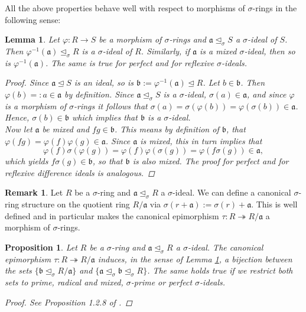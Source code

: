 \documentclass{article}
\def\a{\mathfrak{a}}
\def\b{\mathfrak{b}}
\def\s{\sigma}
\def\si{\unlhd_{\sigma}}
\newenvironment{bew}{\begin{proof}[Proof]}{\end{proof}}
\theoremstyle{plain}
\newtheorem{prop}[Satz]{Proposition}
\newtheorem{lem}[Satz]{Lemma}
\theoremstyle{definition}
\newtheorem{rem}[Satz]{Remark}
\begin{document}
All the above properties behave well with respect to morphisms of $\s$-rings in the following sense:
\begin{lem}\label{bijmapping}
Let $\varphi: R \rightarrow S$ be a morphism of $\s$-rings and $\a \si S$ a $\s$-ideal of $S$. Then $\varphi^{-1}(\a) \si R$ is a $\s$-ideal of $R$. Similarly, if $\a$ is a mixed $\s$-ideal, then so is $\varphi^{-1}(\a)$. The same is true for perfect and for reflexive $\s$-ideals.
\begin{bew}
Since $\a \unlhd S$ is an ideal, so is $\b := \varphi^{-1}(\a) \unlhd R$. Let $b \in \b$. Then $\varphi(b) =: a \in \a$ by definition. Since $\a \si S$ is a $\s$-ideal, $\s(a) \in \a$, and since $\varphi$ is a morphism of $\s$-rings
it follows that $\sigma(a) = \sigma(\varphi(b)) = \varphi (\s (b)) \in \a$. Hence, $\s(b) \in \b$ which implies that $\b$ is a $\s$-ideal. \\
\indent Now let $\a$ be mixed and $fg \in \b$. This means by definition of $\b$, 
that $\varphi(fg) = \varphi(f) \varphi(g) \in \a$. Since $\a$ is mixed, this in turn implies that $$\varphi(f) \s( \varphi(g)) = \varphi(f) \varphi(\s(g)) = \varphi(f\s(g)) \in \a,$$ which yields $f\s(g) \in \b$, so that $\b$ is also mixed. 
The proof for perfect and for reflexive difference ideals is analogous.
\end{bew}
\end{lem}

\begin{rem}
Let $R$ be a $\s$-ring and $\a \si R$ a $\s$-ideal. We can define a canonical $\s$-ring structure on the quotient ring $R/\a$ via $\s(r+\a):= \s(r) + \a$. 
This is well defined and in particular makes the canonical epimorphism $\tau: R \twoheadrightarrow R/\a$ a morphism of $\s$-rings.
\end{rem}

\begin{prop}\label{bijideals}
Let $R$ be a $\s$-ring and $\a \si R$ a $\s$-ideal. The canonical epimorphism $\tau: R \twoheadrightarrow R/\a$ induces, in the sense of Lemma \ref{bijmapping}, a bijection between the sets $\{ \b \si R/\a \}$ and $\{ \a \si \b \si R \}$. The same holds true if we restrict both sets to prime, radical and mixed, $\s$-prime or perfect $\s$-ideals.
\begin{bew}
See Proposition 1.2.8 of \cite{wibmer}.
\end{bew}
\end{prop}
\end{document}

